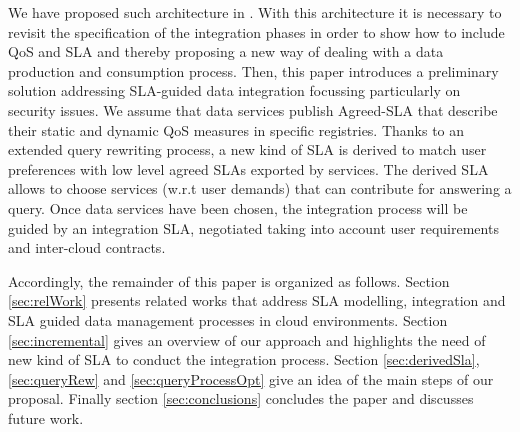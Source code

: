   
 We have proposed such architecture in \cite{DBLP:conf/IEEEcloud/2014}. With this architecture it is necessary to revisit the specification of the integration phases in order to show how to include QoS and SLA and thereby proposing a new way of dealing with a data production and consumption process.  Then, this paper introduces a preliminary solution addressing SLA-guided data integration focussing particularly on security issues. We assume that data services publish Agreed-SLA that describe their  static and dynamic QoS measures in specific registries.  Thanks to an extended query rewriting process, a new kind of SLA is derived to match user preferences with low level agreed SLAs exported by services. The derived SLA allows to choose  services (w.r.t user demands) that can contribute for answering a query. Once data services have been chosen, the integration process will be guided by an integration SLA, negotiated taking into account user requirements and inter-cloud contracts.

 
 
Accordingly, the remainder of this paper is organized as follows. Section \ref{sec:relWork} presents related works that address SLA modelling, integration and SLA guided data management processes in cloud environments. Section \ref{sec:incremental} gives an overview of our approach and highlights the need of new kind of SLA to conduct the integration process. Section \ref{sec:derivedSla}, \ref{sec:queryRew} and \ref{sec:queryProcessOpt} give an idea of the main steps of our proposal.  Finally section  \ref{sec:conclusions} concludes the paper and discusses future work.









 